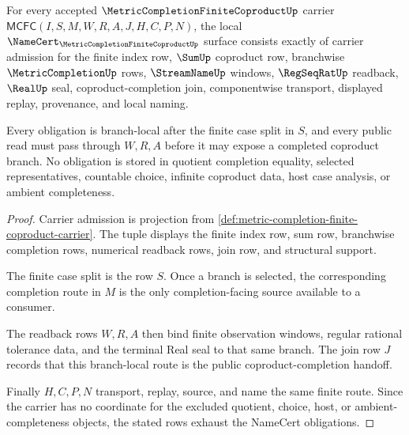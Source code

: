 \begin{theorem}
\label{thm:metric-completion-finite-coproduct-namecert-obligations}
For every accepted $\MetricCompletionFiniteCoproductUp$ carrier $\mathsf{MCFC}(I,S,M,W,R,A,J,H,C,P,N)$, the local $\NameCert_{\MetricCompletionFiniteCoproductUp}$ surface consists exactly of carrier admission for the finite index row, $\SumUp$ coproduct row, branchwise $\MetricCompletionUp$ rows, $\StreamNameUp$ windows, $\RegSeqRatUp$ readback, $\RealUp$ seal, coproduct-completion join, componentwise transport, displayed replay, provenance, and local naming.

Every obligation is branch-local after the finite case split in $S$, and every public read must pass through $W,R,A$ before it may expose a completed coproduct branch. No obligation is stored in quotient completion equality, selected representatives, countable choice, infinite coproduct data, host case analysis, or ambient completeness.
\end{theorem}
\begin{proof}
Carrier admission is projection from \autoref{def:metric-completion-finite-coproduct-carrier}. The tuple displays the finite index row, sum row, branchwise completion rows, numerical readback rows, join row, and structural support.

The finite case split is the row $S$. Once a branch is selected, the corresponding completion route in $M$ is the only completion-facing source available to a consumer.

The readback rows $W,R,A$ then bind finite observation windows, regular rational tolerance data, and the terminal Real seal to that same branch. The join row $J$ records that this branch-local route is the public coproduct-completion handoff.

Finally $H,C,P,N$ transport, replay, source, and name the same finite route. Since the carrier has no coordinate for the excluded quotient, choice, host, or ambient-completeness objects, the stated rows exhaust the NameCert obligations.
\end{proof}


